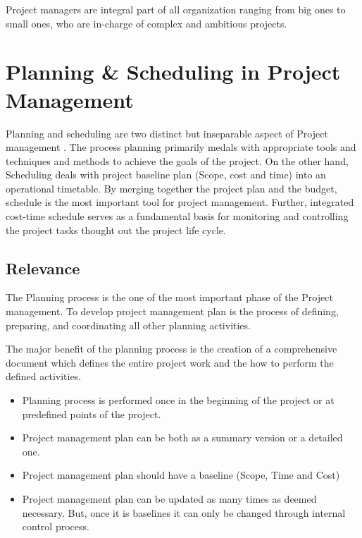 Project managers are integral part of all organization ranging from big ones to small ones, who are in-charge of complex and ambitious projects.

 \section{Planning \& Scheduling in Project Management}
 \label{sec:sec002}
 
 
 Planning and scheduling are two distinct but inseparable aspect of Project management \cite{Moylan}. The process planning primarily medals with appropriate tools and techniques and methods to achieve the goals of the project. On the other hand, Scheduling deals with project baseline plan (Scope, cost and time) into an operational timetable. By merging together the project plan and the budget, schedule is the most important tool for project management. Further, integrated cost-time schedule serves as a fundamental basis for monitoring and controlling the project tasks thought out the project life cycle.
 
 \subsection{Relevance}
 
 The Planning process is the one of the most important phase of the Project management. To develop project management plan is the process of defining, preparing, and coordinating all other planning activities.
 
 The major benefit of the planning process is the creation of a comprehensive document which defines the entire project work and the how to perform the defined activities.
 
 \begin{itemize}
 	\item Planning process is performed once in the beginning of the project or at predefined points of the project.
 	\item  Project management plan can be both as a summary version or a detailed one.
 	\item Project management plan should have  a baseline (Scope, Time and Cost)
 	\item Project management plan can be updated as many times as deemed necessary. But, once it is baselines it can only be changed through internal control process.
 \end{itemize}
 
